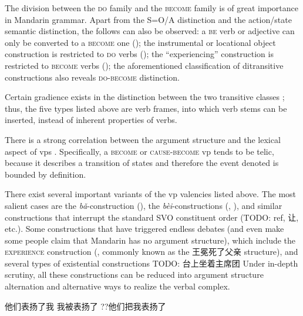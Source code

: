 \documentclass[UTF8, a4paper, oneside, scheme=plain, 12pt]{ctexrep}
\newcommand{\form}[1]{\emph{#1}}
\newcommand*{\category}[1]{\textsc{#1}}
\begin{document}
The division between the \category{do} family and the \category{become} family 
is of great importance in Mandarin grammar. 
Apart from the S=O/A distinction 
and the action/state semantic distinction, 
the follows can also be observed:
a \category{be} verb or adjective can only be converted to 
a \category{become} one (); 
the instrumental or locational object construction 
is restricted to \category{do} verbs (); 
the ``experiencing'' construction is restricted to 
\category{become} verbs (); 
the aforementioned classification of ditransitive constructions 
also reveals \category{do}-\category{become} distinction. 

Certain gradience exists in the distinction between the two transitive classes
\citep{lin2021unaccusativity,huang2007}; 
thus, the five types listed above are verb frames, 
into which verb stems can be inserted, 
instead of inherent properties of verbs. 


There is a strong correlation between the argument structure 
and the lexical aspect of \acs{vp}s
\citep{laws2010core,toratani1997typology,aljovic2000unaccusativity}.
Specifically, a \category{become} or \category{cause}-\category{become} \acs{vp}
tends to be telic, 
because it describes a transition of states 
and therefore the event denoted is bounded by definition.

There exist several important variants of the \acs{vp} valencies listed above.
The most salient cases are the \form{bǎ}-construction (),
the \form{bèi}-constructions 
(, 
),
and similar constructions that interrupt the standard SVO constituent order (TODO: ref, 让, etc.).
Some constructions that have triggered endless debates 
(and even make some people claim that Mandarin has no argument structure),
which include the \category{experience} construction 
(, commonly known as the 王冕死了父亲 structure),
and several types of existential constructions TODO: 台上坐着主席团
Under in-depth scrutiny, 
all these constructions can be reduced into argument structure alternation 
and alternative ways to realize the verbal complex.

\begin{exe}
    \ex 他们表扬了我
    \ex 我被表扬了
    \ex ??他们把我表扬了
\end{exe}
\end{document}
